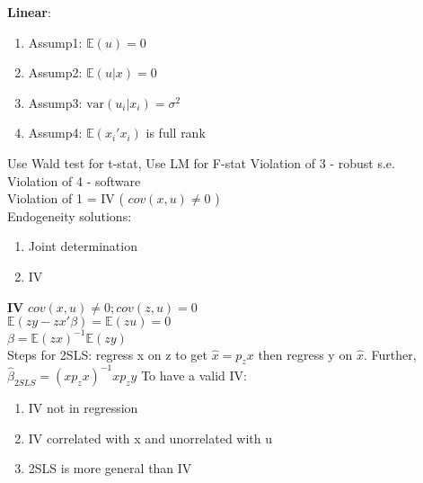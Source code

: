 \documentclass[3pt, a4paper]{article}
\newcommand{\EE}{\mathbb E}
\newcommand{\var}{\text{var}}
\begin{document}
\noindent
\begin{minipage}[t]{0.5\textwidth}
  \textbf{Linear}:
    \begin{enumerate}
      \item Assump1: $\EE(u) = 0$
      \item Assump2: $\EE(u|x) = 0$
      \item Assump3: $\var(u_i|x_i) = \sigma^2$
      \item Assump4: $\EE(x_i'x_i)$ is full rank 
    \end{enumerate}
    Use Wald test for t-stat, Use LM for F-stat
    Violation of 3 - robust s.e.\\
    Violation of 4 - software\\
    Violation of 1 = IV ( $cov(x,u)\ne0$ ) \\
    Endogeneity solutions:
    \begin{enumerate}
      \item Joint determination
      \item IV \\
    \end{enumerate}
  \textbf{IV}
    $cov(x,u)\ne0;cov(z,u)=0$\\
    $\EE(zy-zx'\beta)=\EE(zu)=0$\\
      \rightarrow $\beta = \EE(zx)^{-1}\EE(zy)$ \\
    Steps for 2SLS:
      regress x on z to get $\hat{x} = p_zx$ then regress y on $\hat{x}$. Further, $\hat{\beta}_{2SLS} = (xp_zx)^{-1}xp_zy$
    To have a valid IV:
    \begin{enumerate}
      \item IV not in regression
      \item IV correlated with x and unorrelated with u
      \item 2SLS is more general than IV
    \end{enumerate}
\end{minipage}%
\begin{minipage}[t]{0.4\textwidth}
  
\end{minipage}  
\newpage
\end{document}
